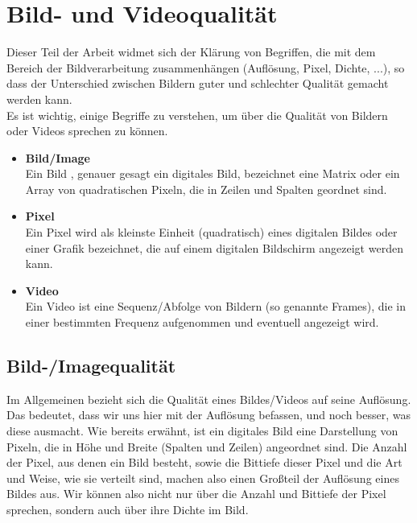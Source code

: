 \section{Bild- und Videoqualität \label{kap0_bildAndVideoQlt}}
Dieser Teil der Arbeit widmet sich der Klärung von Begriffen, die mit dem Bereich der Bildverarbeitung zusammenhängen (Auflösung, Pixel, Dichte, ...), so dass der Unterschied zwischen Bildern guter und schlechter Qualität gemacht werden kann.\\

Es ist wichtig, einige Begriffe zu verstehen, um über die Qualität von Bildern oder Videos sprechen zu können.

\begin{itemize}
	\item \textbf{Bild/Image}\\
	Ein Bild \cite{what_is_a_image}, genauer gesagt ein digitales Bild, bezeichnet eine Matrix oder ein Array von quadratischen Pixeln, die in Zeilen und Spalten geordnet sind. 
	
	\item \textbf{Pixel}\\
	Ein Pixel \cite{what_is_a_pixel} wird als kleinste Einheit (quadratisch) eines digitalen Bildes oder einer Grafik bezeichnet, die auf einem digitalen Bildschirm angezeigt werden kann.
	
	\item \textbf{Video}\\
	Ein Video \cite{diff_imag_vs_video} ist eine Sequenz/Abfolge von Bildern  (so genannte Frames), die in einer bestimmten Frequenz aufgenommen und eventuell angezeigt wird.
\end{itemize}

\subsection{Bild-/Imagequalität \label{kap0_imageQlt}}
Im Allgemeinen bezieht sich die Qualität eines Bildes/Videos auf seine Auflösung. Das bedeutet, dass wir uns hier mit der Auflösung befassen, und noch besser, was diese ausmacht.
Wie bereits erwähnt, ist ein digitales Bild eine Darstellung von Pixeln, die in Höhe und Breite (Spalten und Zeilen) angeordnet sind.
Die Anzahl der Pixel, aus denen ein Bild besteht, sowie die Bittiefe dieser Pixel und die Art und Weise, wie sie verteilt sind, machen also einen Großteil der Auflösung eines Bildes aus.
Wir können also nicht nur über die Anzahl und Bittiefe der Pixel sprechen, sondern auch über ihre Dichte im Bild.\\

